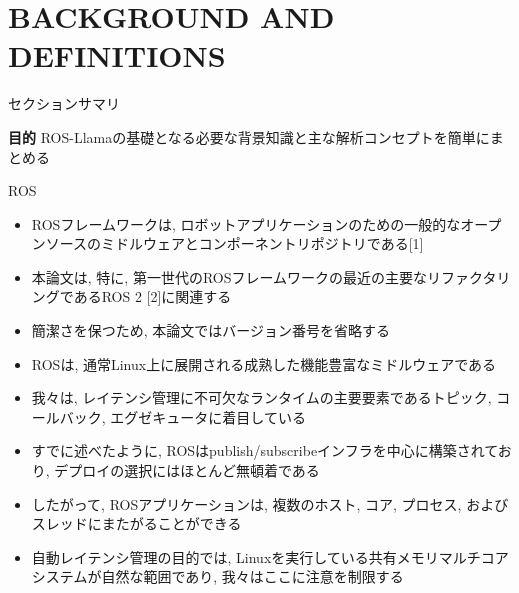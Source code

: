 
\section{BACKGROUND AND DEFINITIONS}
\label{sec: background and definitions}

\begin{frame}{セクションサマリ}
    \begin{itembox}[l]{\textbf{目的}}
        ROS-Llamaの基礎となる必要な背景知識と主な解析コンセプトを簡単にまとめる
    \end{itembox}
\end{frame}

\begin{frame}{ROS}
    \begin{itemize}
        \item ROSフレームワークは, ロボットアプリケーションのための一般的なオープンソースのミドルウェアとコンポーネントリポジトリである[1]
        \item 本論文は, 特に, 第一世代のROSフレームワークの最近の主要なリファクタリングであるROS 2 [2]に関連する
        \item 簡潔さを保つため, 本論文ではバージョン番号を省略する
    \end{itemize}
\end{frame}

\begin{frame}{}
    \begin{itemize}
        \item ROSは, 通常Linux上に展開される成熟した機能豊富なミドルウェアである
        \item 我々は, レイテンシ管理に不可欠なランタイムの主要要素であるトピック, コールバック, エグゼキュータに着目している
        \item すでに述べたように, ROSはpublish/subscribeインフラを中心に構築されており, デプロイの選択にはほとんど無頓着である
        \item したがって, ROSアプリケーションは, 複数のホスト, コア, プロセス, およびスレッドにまたがることができる
        \item 自動レイテンシ管理の目的では, Linuxを実行している共有メモリマルチコアシステムが自然な範囲であり, 我々はここに注意を制限する
    \end{itemize}
\end{frame}

